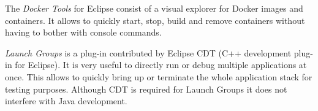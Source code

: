 The \textit{Docker Tools} for Eclipse consist of a visual explorer for Docker
images and containers. It allows to quickly start, stop, build and remove containers
without having to bother with console commands.

\textit{Launch Groups} is a plug-in contributed by Eclipse CDT (C++ development
plug-in for Eclipse). It is very useful to directly run or debug multiple
applications at once. This allows to quickly bring up or terminate the whole
application stack for testing purposes. Although CDT is required for Launch
Groups it does not interfere with Java development.































